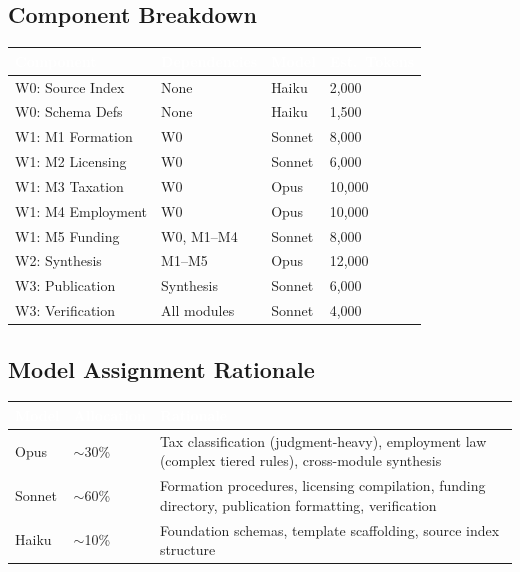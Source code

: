 \documentclass[11pt,letterpaper]{article}
\newcommand{\tableheader}[1]{\textbf{\sffamily\textcolor{white}{#1}}}
\begin{document}
\subsection{Component Breakdown}

\begin{center}
\begin{tabularx}{\textwidth}{L{3cm}L{3cm}C{1.5cm}C{2cm}}
\toprule
{}
\tableheader{Component} & \tableheader{Dependencies} & \tableheader{Model} & \tableheader{Est.\ Tokens} \\
\midrule
W0: Source Index & None & Haiku & 2,000 \\
W0: Schema Defs & None & Haiku & 1,500 \\
W1: M1 Formation & W0 & Sonnet & 8,000 \\
W1: M2 Licensing & W0 & Sonnet & 6,000 \\
W1: M3 Taxation & W0 & Opus & 10,000 \\
W1: M4 Employment & W0 & Opus & 10,000 \\
W1: M5 Funding & W0, M1--M4 & Sonnet & 8,000 \\
W2: Synthesis & M1--M5 & Opus & 12,000 \\
W3: Publication & Synthesis & Sonnet & 6,000 \\
W3: Verification & All modules & Sonnet & 4,000 \\
\bottomrule
\end{tabularx}
\end{center}

\subsection{Model Assignment Rationale}

\begin{center}
\begin{tabularx}{\textwidth}{C{1.5cm}C{1.5cm}X}
\toprule
{}
\tableheader{Model} & \tableheader{Allocation} & \tableheader{Rationale} \\
\midrule
Opus & $\sim$30\% & Tax classification (judgment-heavy), employment law (complex tiered rules), cross-module synthesis \\
Sonnet & $\sim$60\% & Formation procedures, licensing compilation, funding directory, publication formatting, verification \\
Haiku & $\sim$10\% & Foundation schemas, template scaffolding, source index structure \\
\bottomrule
\end{tabularx}
\end{center}
\end{document}
